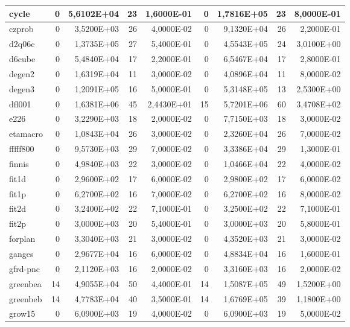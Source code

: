\begin{tabular}{|l|r|r|r|r|r|r|r|r|}
cycle & 0 & 5,6102E+04 & 23 & 1,6000E-01 & 0 & 1,7816E+05 & 23 & 8,0000E-01 \\ \hline
czprob & 0 & 3,5200E+03 & 26 & 4,0000E-02 & 0 & 9,1320E+04 & 26 & 2,2000E-01 \\ \hline
d2q06c & 0 & 1,3735E+05 & 27 & 5,4000E-01 & 0 & 4,5543E+05 & 24 & 3,0100E+00 \\ \hline
d6cube & 0 & 5,4840E+04 & 17 & 2,2000E-01 & 0 & 6,5467E+04 & 17 & 2,8000E-01 \\ \hline
degen2 & 0 & 1,6319E+04 & 11 & 3,0000E-02 & 0 & 4,0896E+04 & 11 & 8,0000E-02 \\ \hline
degen3 & 0 & 1,2091E+05 & 16 & 5,0000E-01 & 0 & 5,3148E+05 & 13 & 2,5300E+00 \\ \hline
dfl001 & 0 & 1,6381E+06 & 45 & 2,4430E+01 & 15 & 5,7201E+06 & 60 & 3,4708E+02 \\ \hline
e226 & 0 & 3,2290E+03 & 18 & 2,0000E-02 & 0 & 7,7150E+03 & 18 & 3,0000E-02 \\ \hline
etamacro & 0 & 1,0843E+04 & 26 & 3,0000E-02 & 0 & 2,3260E+04 & 26 & 7,0000E-02 \\ \hline
fffff800 & 0 & 9,5730E+03 & 29 & 7,0000E-02 & 0 & 3,3386E+04 & 29 & 1,3000E-01 \\ \hline
finnis & 0 & 4,9840E+03 & 22 & 3,0000E-02 & 0 & 1,0466E+04 & 22 & 4,0000E-02 \\ \hline
fit1d & 0 & 2,9600E+02 & 17 & 6,0000E-02 & 0 & 2,9800E+02 & 17 & 6,0000E-02 \\ \hline
fit1p & 0 & 6,2700E+02 & 16 & 7,0000E-02 & 0 & 6,2700E+02 & 16 & 8,0000E-02 \\ \hline
fit2d & 0 & 3,2400E+02 & 22 & 7,1000E-01 & 0 & 3,2500E+02 & 22 & 7,1000E-01 \\ \hline
fit2p & 0 & 3,0000E+03 & 20 & 5,4000E-01 & 0 & 3,0000E+03 & 20 & 5,8000E-01 \\ \hline
forplan & 0 & 3,3040E+03 & 21 & 3,0000E-02 & 0 & 4,3520E+03 & 21 & 3,0000E-02 \\ \hline
ganges & 0 & 2,9677E+04 & 16 & 6,0000E-02 & 0 & 4,8834E+04 & 16 & 1,6000E-01 \\ \hline
gfrd-pnc & 0 & 2,1120E+03 & 16 & 2,0000E-02 & 0 & 3,3160E+03 & 16 & 2,0000E-02 \\ \hline
greenbea & 14 & 4,9055E+04 & 50 & 4,4000E-01 & 14 & 1,5087E+05 & 49 & 1,5200E+00 \\ \hline
greenbeb & 14 & 4,7783E+04 & 40 & 3,5000E-01 & 14 & 1,6769E+05 & 39 & 1,1800E+00 \\ \hline
grow15 & 0 & 6,0900E+03 & 19 & 4,0000E-02 & 0 & 6,0900E+03 & 19 & 5,0000E-02 \\ \hline

\end{tabular}
